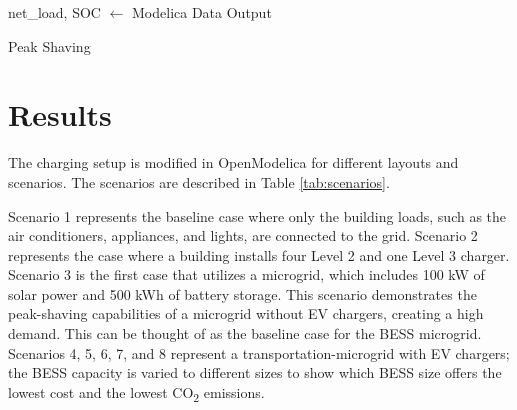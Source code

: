 \documentclass[conference]{IEEEtran}
\begin{document}
		\begin{algorithm}
			net\_load, SOC $\gets$ Modelica Data Output
			\caption{Peak Shaving}
			\label{alg:peakshavingflatrate}
		\end{algorithm}
\section{Results}
		The charging setup is modified in OpenModelica for different layouts and scenarios. The scenarios are described in Table \ref{tab:scenarios}.
		
		Scenario 1 represents the baseline case where only the building loads, such as the air conditioners, appliances, and lights, are connected to the grid. Scenario 2 represents the case where a building installs four Level 2 and one Level 3 charger. Scenario 3 is the first case that utilizes a microgrid, which includes 100 kW of solar power and 500 kWh of battery storage. This scenario demonstrates the peak-shaving capabilities of a microgrid without EV chargers, creating a high demand. This can be thought of as the baseline case for the BESS microgrid. Scenarios 4, 5, 6, 7, and 8 represent a transportation-microgrid with EV chargers; the BESS capacity is varied to different sizes to show which BESS size offers the lowest cost and the lowest CO\textsubscript{2} emissions. 
		
\end{document}
